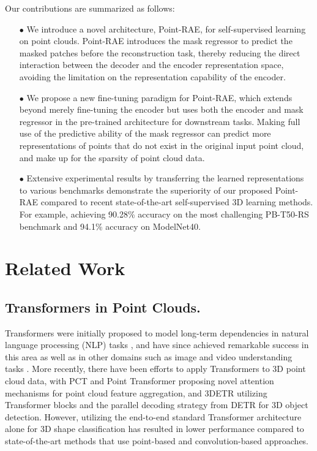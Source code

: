 \documentclass[sigconf, screen]{acmart}
\begin{document}
Our contributions are summarized as follows:
\begin{enumerate}[leftmargin=1em,parsep=1pt]
\item[$\bullet$] We introduce a novel architecture, Point-RAE, for self-supervised learning on point clouds. 
Point-RAE introduces the mask regressor to predict the masked patches before the reconstruction task, thereby reducing the direct interaction between the decoder and the encoder representation space, avoiding the limitation on the representation capability of the encoder.
\item[$\bullet$] We propose a new fine-tuning paradigm for Point-RAE, which extends beyond merely fine-tuning the encoder but uses both the encoder and mask regressor in the pre-trained architecture for downstream tasks.
Making full use of the predictive ability of the mask regressor can predict more representations of points that do not exist in the original input point cloud, and make up for the sparsity of point cloud data.
\item[$\bullet$] 
Extensive experimental results by transferring the learned representations to various benchmarks demonstrate the superiority of our proposed Point-RAE compared to recent state-of-the-art self-supervised 3D learning methods. For example, achieving 90.28\% accuracy on the most challenging PB-T50-RS benchmark and 94.1\% accuracy on ModelNet40.

\end{enumerate}


\section{Related Work}

\subsection{Transformers in Point Clouds.} Transformers were initially proposed to model long-term dependencies in natural language processing (NLP) tasks \cite{vaswani2017attention}, and have since achieved remarkable success in this area \cite{devlin2018bert, radford2018improving} as well as in other domains such as image and video understanding tasks \cite{dosovitskiy2020image, jiang2021transgan, radford2021learning, steiner2021train, wang2021max}. More recently, there have been efforts to apply Transformers to 3D point cloud data, with PCT \cite{guo2021pct} and Point Transformer \cite{zhao2021point} proposing novel attention mechanisms for point cloud feature aggregation, and 3DETR \cite{misra2021end} utilizing Transformer blocks and the parallel decoding strategy from DETR \cite{carion2020end} for 3D object detection.
However, utilizing the end-to-end standard Transformer architecture alone for 3D shape classification has resulted in lower performance compared to state-of-the-art methods that use point-based \cite{ma2022rethinking} and convolution-based \cite{qiu2021geometric} approaches.
\end{document}
